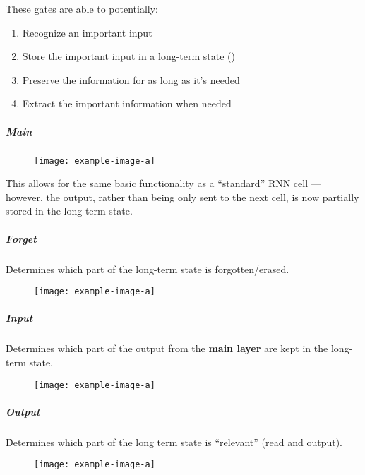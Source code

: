 \r{These gates are able to potentially:}

\begin{enumerate}[noitemsep,topsep=0pt]
	\item Recognize an important input
	\item Store the important input in a long-term state ()
	\item Preserve the information for as long as it's needed
	\item Extract the important information when needed
\end{enumerate}


\subparagraph{Main}

\begin{figure}
	\centering
	\texttt{[image: example-image-a]}\hfil
	\caption{}
\end{figure}

\r{This allows for the same basic functionality as a ``standard'' RNN cell --- however, the output, rather than being only sent to the next cell, is now partially stored in the long-term state.}


\subparagraph{Forget}

\r{Determines which part of the long-term state is forgotten/erased.}

\begin{figure}
	\centering
	\texttt{[image: example-image-a]}\hfil
	\caption{}
\end{figure}



\subparagraph{Input}

\r{Determines which part of the output from the \textbf{main layer} are kept in the long-term state.}

\begin{figure}
	\centering
	\texttt{[image: example-image-a]}\hfil
	\caption{}
\end{figure}

\subparagraph{Output}

\r{Determines which part of the long term state is ``relevant'' (read and output).}

\begin{figure}
	\centering
	\texttt{[image: example-image-a]}\hfil
	\caption{}
\end{figure}


